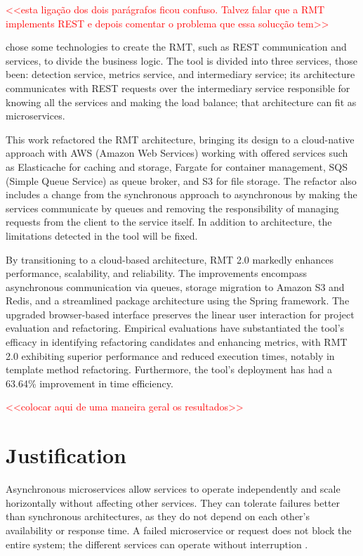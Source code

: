 \textcolor{red}{<<esta ligação dos dois parágrafos ficou confuso. Talvez falar que a RMT implements REST e depois comentar o problema que essa solucção tem>>}

\textcite{beluzzo2018abordagem} chose some technologies to create the RMT, such as REST communication and services, to divide the business logic. The tool is divided into three services, those been: detection service, metrics service, and intermediary service; its architecture communicates with REST requests over the intermediary service responsible for knowing all the services and making the load balance; that architecture can fit as microservices.

This work refactored the RMT architecture, bringing its design to a cloud-native approach with AWS (Amazon Web Services) working with offered services such as Elasticache for caching and storage, Fargate for container management, SQS (Simple Queue Service) as queue broker, and S3 for file storage. The refactor also includes a change from the synchronous approach to asynchronous by making the services communicate by queues and removing the responsibility of managing requests from the client to the service itself. In addition to architecture, the limitations detected in the tool will be fixed.

By transitioning to a cloud-based architecture, RMT 2.0 markedly enhances performance, scalability, and reliability. The improvements encompass asynchronous communication via queues, storage migration to Amazon S3 and Redis, and a streamlined package architecture using the Spring framework. The upgraded browser-based interface preserves the linear user interaction for project evaluation and refactoring. Empirical evaluations have substantiated the tool's efficacy in identifying refactoring candidates and enhancing metrics, with RMT 2.0 exhibiting superior performance and reduced execution times, notably in template method refactoring. Furthermore, the tool's deployment has had a 63.64\% improvement in time efficiency.


\textcolor{red}{<<colocar aqui de uma maneira geral os resultados>>}

\section{Justification}
Asynchronous microservices allow services to operate independently and scale horizontally without affecting other services. They can tolerate failures better than synchronous architectures, as they do not depend on each other's availability or response time. A failed microservice or request does not block the entire system; the different services can operate without interruption \cite{microservices-comuni}.


